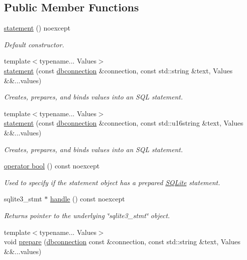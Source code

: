 \subsection*{Public Member Functions}
\begin{DoxyCompactItemize}
\item 
\hyperlink{a00013_a1355244b2e1153eb26daea61e52e153a}{statement} () noexcept
\begin{DoxyCompactList}\small\item\em Default constructor. \end{DoxyCompactList}\item 
{\footnotesize template$<$typename... Values$>$ }\\\hyperlink{a00013_ae92826d1d30ee7ea86a5e8ac6aad8aac}{statement} (const \hyperlink{a00004}{dbconnection} \&connection, const std\-::string \&text, Values \&\&...values)
\begin{DoxyCompactList}\small\item\em Creates, prepares, and binds values into an S\-Q\-L statement. \end{DoxyCompactList}\item 
{\footnotesize template$<$typename... Values$>$ }\\\hyperlink{a00013_a5b4dd3c704336b6373880dce27fe5b71}{statement} (const \hyperlink{a00004}{dbconnection} \&connection, const std\-::u16string \&text, Values \&\&...values)
\begin{DoxyCompactList}\small\item\em Creates, prepares, and binds values into an S\-Q\-L statement. \end{DoxyCompactList}\item 
\hyperlink{a00013_a558b055f3210c6ab7575dc2c23cb7be2}{operator bool} () const noexcept
\begin{DoxyCompactList}\small\item\em Used to specify if the statement object has a prepared \hyperlink{a00038}{S\-Q\-Lite} statement. \end{DoxyCompactList}\item 
sqlite3\-\_\-stmt $\ast$ \hyperlink{a00013_aef59d3eb044ce240bd9ca3c8958d4abe}{handle} () const noexcept
\begin{DoxyCompactList}\small\item\em Returns pointer to the underlying \char`\"{}sqlite3\-\_\-stmt\char`\"{} object. \end{DoxyCompactList}\item 
{\footnotesize template$<$typename... Values$>$ }\\void \hyperlink{a00013_a6825366938fd914456b63c7e63ddc6f0}{prepare} (\hyperlink{a00004}{dbconnection} const \&connection, const std\-::string \&text, Values \&\&...values)

\end{DoxyCompactItemize}
